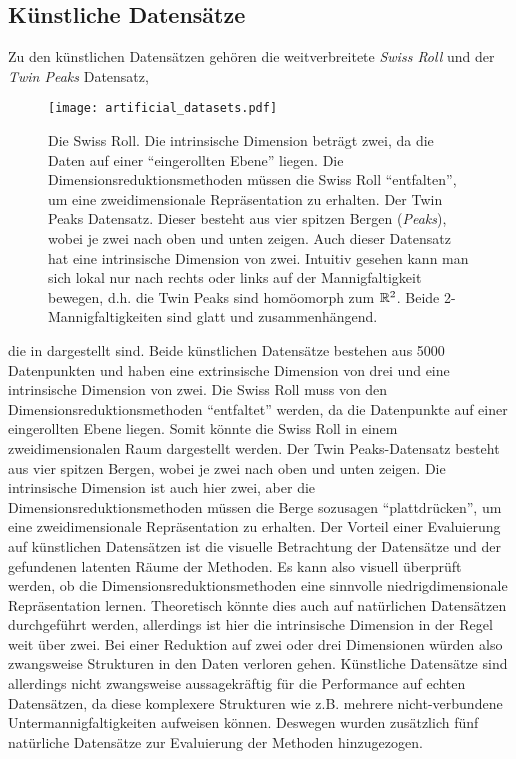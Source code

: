 \subsection{Künstliche Datensätze}
\label{ch:Vergleich:sec:VerwendeteDatensaetze:kuenstlich}
Zu den künstlichen Datensätzen gehören die weitverbreitete \textit{Swiss Roll} und der \textit{Twin Peaks} Datensatz,
\begin{figure}[ht]
	\begin{center}
		\texttt{[image: artificial\_datasets.pdf]}
	\end{center}
	\caption[Künstliche Datensätze]{\figleft Die Swiss Roll. Die intrinsische Dimension beträgt zwei, da die Daten auf einer \enquote{eingerollten Ebene} liegen. Die Dimensionsreduktionsmethoden müssen die Swiss Roll \enquote{entfalten}, um eine zweidimensionale Repräsentation zu erhalten. \figright Der Twin Peaks Datensatz. Dieser besteht aus vier spitzen Bergen (\textit{Peaks}), wobei je zwei nach oben und unten zeigen. Auch dieser Datensatz hat eine intrinsische Dimension von zwei. Intuitiv gesehen kann man sich lokal nur nach rechts oder links auf der Mannigfaltigkeit bewegen, d.h. die Twin Peaks sind homöomorph zum $\mathbb{R}^2$. Beide 2-Mannigfaltigkeiten sind glatt und zusammenhängend.}
	\label{fig:ArtificialDatasets}
\end{figure}
die in  dargestellt sind.
Beide künstlichen Datensätze bestehen aus \num{5000} Datenpunkten und haben eine extrinsische Dimension von drei und eine intrinsische
Dimension von zwei. Die Swiss Roll muss von den Dimensionsreduktionsmethoden \enquote{entfaltet} werden, da die Datenpunkte auf einer eingerollten Ebene liegen. Somit könnte die Swiss Roll in einem zweidimensionalen Raum dargestellt werden. Der Twin Peaks-Datensatz besteht aus vier spitzen Bergen, wobei je zwei nach oben und unten zeigen. Die intrinsische Dimension ist auch hier zwei, aber die Dimensionsreduktionsmethoden müssen die Berge sozusagen \enquote{plattdrücken}, um eine zweidimensionale Repräsentation zu erhalten. Der Vorteil einer Evaluierung auf künstlichen Datensätzen ist die visuelle Betrachtung der Datensätze und der gefundenen
latenten Räume der Methoden. Es kann also visuell überprüft werden, ob die Dimensionsreduktionsmethoden eine sinnvolle niedrigdimensionale Repräsentation lernen. Theoretisch könnte dies auch auf natürlichen Datensätzen durchgeführt werden, allerdings ist hier die intrinsische Dimension in der Regel weit über zwei. Bei einer Reduktion auf zwei oder drei Dimensionen würden also zwangsweise Strukturen in den Daten verloren gehen. Künstliche Datensätze sind allerdings nicht zwangsweise aussagekräftig für die Performance auf echten Datensätzen, da diese komplexere Strukturen wie z.B. mehrere nicht-verbundene Untermannigfaltigkeiten aufweisen können. Deswegen wurden zusätzlich fünf natürliche Datensätze zur Evaluierung der Methoden hinzugezogen.

